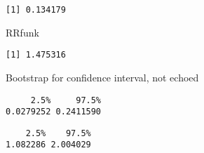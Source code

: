 \documentclass[
  letterpaper,
  DIV=11,
  numbers=noendperiod]{scrartcl}
\newenvironment{Shaded}{\begin{snugshade}}{\end{snugshade}}
\newcommand{\NormalTok}[1]{\textcolor[rgb]{0.00,0.23,0.31}{#1}}
\begin{document}
\begin{verbatim}
[1] 0.134179
\end{verbatim}

\begin{Shaded}
\begin{Highlighting}[]
\NormalTok{RRfunk}
\end{Highlighting}
\end{Shaded}

\begin{verbatim}
[1] 1.475316
\end{verbatim}

Bootstrap for confidence interval, not echoed

\begin{verbatim}
     2.5%     97.5% 
0.0279252 0.2411590 
\end{verbatim}

\begin{verbatim}
    2.5%    97.5% 
1.082286 2.004029 
\end{verbatim}
\end{document}
